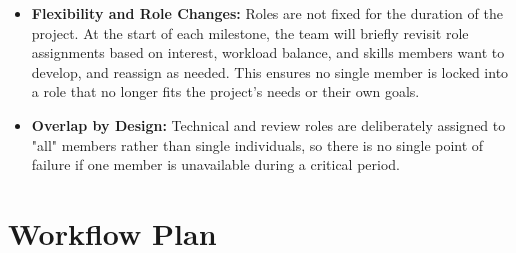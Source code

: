 \documentclass{article}
\begin{document}
\begin{itemize}
    \item \textbf{Flexibility and Role Changes:} Roles are not fixed for the duration of the project. At the start of each milestone, the team will briefly revisit role assignments based on interest, workload balance, and skills members want to develop, and reassign as needed. This ensures no single member is locked into a role that no longer fits the project's needs or their own goals.

    \item \textbf{Overlap by Design:} Technical and review roles are deliberately assigned to "all" members rather than single individuals, so there is no single point of failure if one member is unavailable during a critical period.
\end{itemize}

\section{Workflow Plan}
\end{document}
